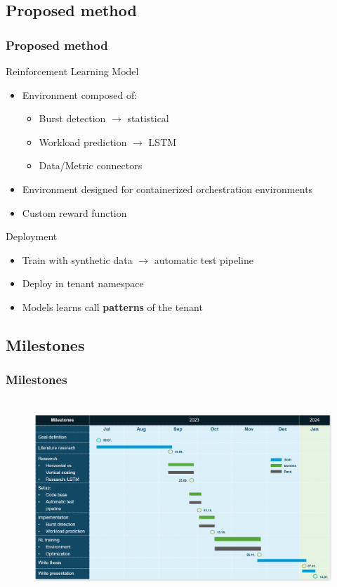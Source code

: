 \documentclass[11pt,t,usepdftitle=false,aspectratio=169]{beamer}
\begin{document}
\subsection{Proposed method}
\begin{frame}
	\frametitle{Proposed method}
	
	\begin{alertblock}{Reinforcement Learning Model}
		\begin{itemize}
			\item Environment composed of:
			\begin{itemize}
				\item Burst detection $\rightarrow$ statistical
				\item Workload prediction $\rightarrow$ LSTM
				\item Data/Metric connectors
			\end{itemize}
			
			\item Environment designed for containerized orchestration environments
			\item Custom reward function
		\end{itemize}
	\end{alertblock}
	
	\begin{block}{Deployment}
		\begin{itemize}
			\item Train with synthetic data $\rightarrow$ automatic test pipeline
			\item Deploy in tenant namespace
			\item Models learns call \textbf{\color{uibkorange} patterns} of the tenant
		\end{itemize}
	\end{block}
\end{frame}


\subsection{Milestones}
\begin{frame}
	\frametitle{Milestones}
	
	\begin{figure}
		\centering
		\vspace*{-1cm}
		\includegraphics[width=14.5cm,height=7.4cm]{_images/milestones.png}
	\end{figure}
\end{frame}
\end{document}
